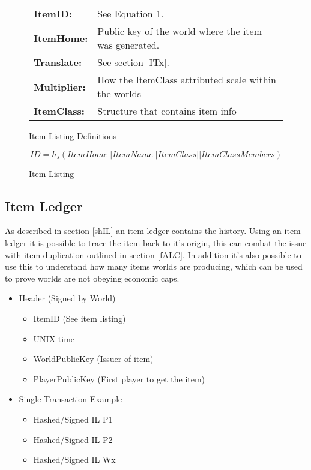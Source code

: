 \documentclass[runningheads,a4paper]{llncs}
\begin{document}
\begin{figure}
\label{ILexp}
\caption{Item Listing Definitions}
\begin{tabular}{l l}
\textbf{ItemID:} & See Equation 1. \\
\textbf{ItemHome:} & Public key of the world where the item was generated. \\
\textbf{Translate:} & See section \ref{ITx}. \\
\textbf{Multiplier:} & How the ItemClass attributed scale within the worlds \\
\textbf{ItemClass:} & Structure that contains item info
\end{tabular}
\end{figure}

\begin{equation}
\label{ItemID}
ID = h_s(ItemHome || ItemName || ItemClass || ItemClassMembers)
\end{equation}

\begin{figure}
\caption{Item Listing}
\label{IList}

\end{figure}

\subsection{Item Ledger}
\label{IL}
As described in section \ref{shIL} an item ledger contains the history. Using an item ledger it is possible to trace the item back to it's origin, this can combat the issue with item duplication outlined in section \ref{fALC}. In addition it's also possible to use this to understand how many items worlds are producing, which can be used to prove worlds are not obeying economic caps.

\begin{itemize}
\item{Header (Signed by World)}
\begin{itemize}
\item{ItemID (See item listing)}
\item{UNIX time}
\item{WorldPublicKey (Issuer of item)}
\item{PlayerPublicKey (First player to get the item)}
\end{itemize}
\item{Single Transaction Example}
\begin{itemize}
\item{Hashed/Signed IL P1}
\item{Hashed/Signed IL P2}
\item{Hashed/Signed IL Wx}
\end{itemize}
\end{itemize}
\end{document}

